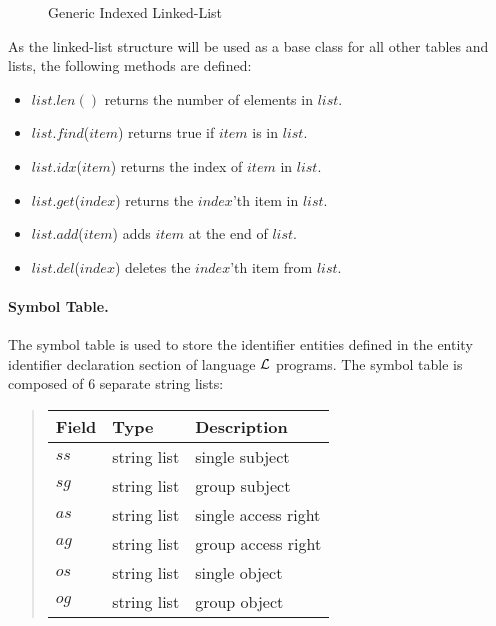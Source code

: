\documentclass[10pt, twocolumn]{article}
\begin{document}
        \begin{figure}[ht]
          \begin{center}
            \caption{Generic Indexed Linked-List}
            \label{fig-2}
          \end{center}
        \end{figure}

        As the linked-list structure will be used as a base class for all other
        tables and lists, the following methods are defined:

        \begin{itemize}
          \item
            $list.len()$
            returns the number of elements in $list$.
          \item
            $list$.$find$($item$)
            returns true if $item$ is in $list$.
          \item
            $list$.$idx$($item$)
            returns the index of $item$ in $list$.
          \item
            $list$.$get$($index$)
            returns the $index$'th item in $list$.
          \item
            $list$.$add$($item$)
            adds $item$ at the end of $list$.
          \item
            $list$.$del$($index$)
            deletes the $index$'th item from $list$.
        \end{itemize}

        \paragraph{Symbol Table.}

          The symbol table is used to store the identifier entities defined in
          the entity identifier declaration section of language ${\cal L}$
          programs. The symbol table is composed of 6 separate string lists:

          \begin{quote}
            \begin{tabular}[t]{|l|l|l|}
              \hline
              \textbf{Field} & \textbf{Type} & \textbf{Description} \\
              \hline
              $ss$ & string list & single subject \\
              \hline
              $sg$ & string list & group subject \\
              \hline
              $as$ & string list & single access right \\
              \hline
              $ag$ & string list & group access right \\
              \hline
              $os$ & string list & single object \\
              \hline
              $og$ & string list & group object \\
              \hline
            \end{tabular}
          \end{quote}
\end{document}
